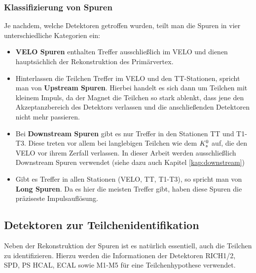 \subsubsection{Klassifizierung von Spuren}
Je nachdem, welche Detektoren getroffen wurden, teilt man die Spuren in vier unterschiedliche Kategorien ein:
\begin{itemize}
\item \textbf{VELO Spuren} enthalten Treffer ausschließlich im VELO und dienen hauptsächlich der Rekonstruktion des Primärvertex.
\item Hinterlassen die Teilchen Treffer im VELO und den TT-Stationen, spricht man von \textbf{Upstream Spuren}. Hierbei handelt es sich dann um Teilchen mit kleinem Impuls, da der Magnet die Teilchen so stark ablenkt, dass jene den Akzeptanzbereich des Detektors verlassen und die anschließenden Detektoren nicht mehr passieren.
\item Bei \textbf{Downstream Spuren} gibt es nur Treffer in den Stationen TT und T1-T3. Diese treten vor allem bei langlebigen Teilchen wie dem $K_s^0$ auf, die den VELO vor ihrem Zerfall verlassen. In dieser Arbeit werden ausschließlich Downstream Spuren verwendet (siehe dazu auch Kapitel \ref{kap:downstream})
\item Gibt es Treffer in allen Stationen (VELO, TT, T1-T3), so spricht man von \textbf{Long Spuren}. Da es hier die meisten Treffer gibt, haben diese Spuren die präziseste Impulsauflösung. \cite{thesis_linn}
\end{itemize}

\subsection{Detektoren zur Teilchenidentifikation}
Neben der Rekonstruktion der Spuren ist es natürlich essentiell, auch die Teilchen zu identifizieren. Hierzu werden die Informationen der Detektoren RICH1/2, SPD, PS HCAL, ECAL sowie M1-M5 für eine Teilchenhypothese verwendet.

